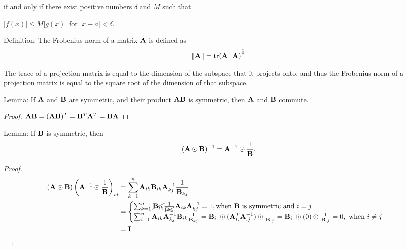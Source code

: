 \documentclass{amsart}[12pt]
\begin{document}
if and only if there exist positive numbers $\delta$ and $M$ such that

$|f(x)| \leq M |g(x)| \text{ for } |x - a| < \delta$.

Definition:
The Frobenius norm of a matrix ${\bf A}$ is defined as
\begin{align*}
	\| {\bf A} \| = \text{tr}{({\bf A}^\top {\bf A})}^{\frac{1}{2}} 
\end{align*}

The trace of a projection matrix is equal to the dimension of the subspace that it projects onto, and thus
the Frobenius norm of a projection matrix is equal to the square root of the dimension of that subspace.

Lemma:
If ${\bf A}$ and ${\bf B}$ are symmetric, and their product ${\bf A} {\bf B}$ is symmetric, then ${\bf A}$ and ${\bf B}$ commute.
\begin{proof}
	${\bf A} {\bf B} = ({\bf A} {\bf B})^T = {\bf B}^T {\bf A}^T = {\bf B} {\bf A}$
\end{proof}

Lemma:
If ${\bf B}$ is symmetric, then
\[
	({\bf A} \odot {\bf B})^{-1} = {\bf A}^{-1} \odot \frac{1}{{\bf B}}.
\]
\begin{proof}
	\begin{align*}
		({\bf A} \odot {\bf B})\left({\bf A}^{-1} \odot \frac{1}{{\bf B}}\right)_{ij} & = \sum_{k=1}^n {\bf A}_{ik} {\bf B}_{ik} {\bf A}^{-1}_{kj} \frac{1}{{\bf B}_{kj}} \\
		                                                              & =                                                                 
		\begin{cases}
		\sum_{k=1}^n \cancel{{\bf B}_{ik}} \frac{1}{\cancel{{\bf B}_{ik}}} {\bf A}_{ik} {\bf A}^{-1}_{kj} = 1, \text{when ${\bf B}$ is symmetric and $i = j$} \\
		\sum_{i=1}^n {\bf A}_{ik} {\bf A}^{-1}_{kj} {\bf B}_{ik} \frac{1}{{\bf B}_{kj}}
		= {\bf B}_{i.} \odot ({\bf A}^T_{i.} {\bf A}^{-1}_{.j}) \odot \frac{1}{{\bf B}_{.j}}
		= {\bf B}_{i.} \odot (0) \odot \frac{1}{{\bf B}_{.j}}
		= 0, \text{ when $i \ne j$}
		\end{cases}\\
		                                                              & = {\bf I}                                                             
	\end{align*}
\end{proof}
\end{document}
